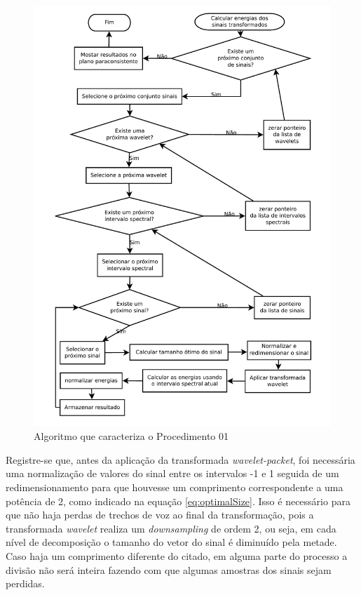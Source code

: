 		\begin{figure}[H]
			\centering
			\includegraphics[width=1\linewidth]{images/AlgoProcedure01.pdf}
			\caption{Algoritmo que caracteriza o Procedimento 01}
			\label{fig:experiment01Algo}
		\end{figure}
		
		\par Registre-se que, antes da aplicação da transformada \textit{wavelet-packet}, foi necessária uma normalização de valores do sinal entre os intervalos -1 e 1 seguida de um redimensionamento para que houvesse um comprimento correspondente a uma potência de 2, como indicado na equação \ref{eq:optimalSize}. Isso é necessário para que não haja perdas de trechos de voz ao final da transformação, pois a transformada \textit{wavelet} realiza um \textit{downsampling} de ordem 2, ou seja, em cada nível de decomposição o tamanho do vetor do sinal é diminuído pela metade. Caso haja um comprimento diferente do citado, em alguma parte do processo a divisão não será inteira fazendo com que algumas amostras dos sinais sejam perdidas.
				
